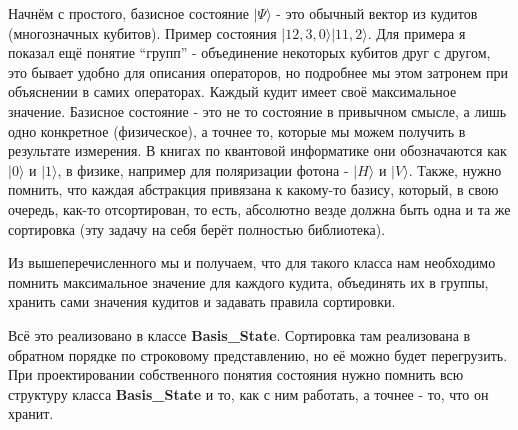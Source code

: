 \documentclass[12pt,fleqn]{article}
\begin{document}
        Начнём с простого, базисное состояние $|\Psi\rangle$ - это обычный вектор из кудитов (многозначных кубитов). Пример состояния $|12,3,0\rangle|11,2\rangle$.
         Для примера я показал ещё понятие ``групп'' - объединение некоторых кубитов друг с другом, это бывает удобно для описания операторов, но подробнее мы этом затронем при объяснении в самих операторах.
        Каждый кудит имеет своё максимальное значение. Базисное состояние - это не то состояние в привычном смысле, а лишь одно конкретное (физическое), а точнее то, которые мы можем получить в результате 
        измерения. В книгах по квантовой информатике они обозначаются как $|0\rangle$ и $|1\rangle$, в физике, например для поляризации фотона - $|H\rangle$ и $|V\rangle$. Также, нужно помнить, что каждая
        абстракция привязана к какому-то базису, который, в свою очередь, как-то отсортирован, то есть, абсолютно везде должна быть одна и та же сортировка (эту задачу на себя берёт полностью библиотека).

        Из вышеперечисленного мы и получаем, что для такого класса нам необходимо помнить максимальное значение для каждого кудита, объединять их в группы, хранить сами значения кудитов и задавать 
        правила сортировки.

        Всё это реализовано в классе \textbf{Basis\_State}. Сортировка там реализована в обратном порядке по строковому представлению, но её можно будет перегрузить.
        При проектировании собственного понятия состояния нужно помнить всю структуру класса \textbf{Basis\_State} и то, как с ним работать, а точнее - то, что он хранит.
\end{document}
